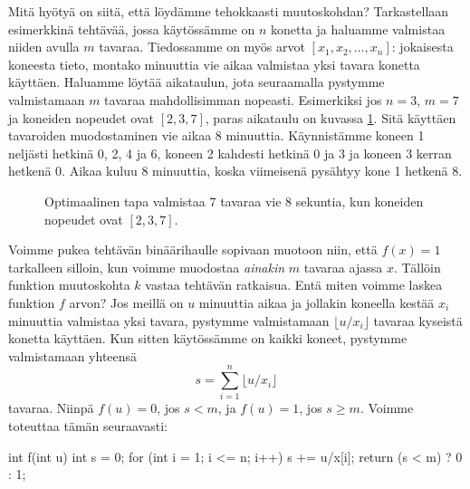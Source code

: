 Mitä hyötyä on siitä, että löydämme tehokkaasti muutoskohdan?
Tarkastellaan esimerkkinä tehtävää, jossa käytössämme on $n$ konetta
ja haluamme valmistaa niiden avulla $m$ tavaraa.
Tiedossamme on myös arvot $[x_1,x_2,\dots,x_n]$:
jokaisesta koneesta tieto, montako minuuttia vie aikaa valmistaa
yksi tavara konetta käyttäen.
Haluamme löytää aikataulun, jota seuraamalla pystymme valmistamaan
$m$ tavaraa mahdollisimman nopeasti.
Esimerkiksi jos $n=3$, $m=7$ ja koneiden nopeudet ovat $[2,3,7]$,
paras aikataulu on kuvassa \ref{fig:optkon}.
Sitä käyttäen tavaroiden muodostaminen vie aikaa $8$ minuuttia.
Käynnistämme koneen 1 neljästi hetkinä 0, 2, 4 ja 6,
koneen 2 kahdesti hetkinä 0 ja 3
ja koneen 3 kerran hetkenä 0.
Aikaa kuluu $8$ minuuttia, koska viimeisenä pysähtyy kone 1 hetkenä 8.

\begin{figure}
\center
{}
\caption{Optimaalinen tapa valmistaa 7 tavaraa vie 8 sekuntia,
kun koneiden nopeudet ovat $[2,3,7]$.}
\label{fig:optkon}
\end{figure}

Voimme pukea tehtävän binäärihaulle sopivaan muotoon niin,
että $f(x)=1$ tarkalleen silloin, kun voimme muodostaa
\emph{ainakin} $m$ tavaraa ajassa $x$.
Tällöin funktion muutoskohta $k$ vastaa tehtävän ratkaisua.
Entä miten voimme laskea funktion $f$ arvon?
Jos meillä on $u$ minuuttia aikaa ja jollakin koneella kestää $x_i$
minuuttia valmistaa yksi tavara, pystymme valmistamaan
$\lfloor u/x_i \rfloor$ tavaraa kyseistä konetta käyttäen.
Kun sitten käytössämme on kaikki koneet,
pystymme valmistamaan yhteensä
\[ s = \sum_{i=1}^n \lfloor u/x_i \rfloor \]
tavaraa. Niinpä $f(u)=0$, jos $s<m$,
ja $f(u)=1$, jos $s \ge m$. Voimme toteuttaa tämän seuraavasti:

\begin{code}
int f(int u) {
    int s = 0;
    for (int i = 1; i <= n; i++) s += u/x[i];
    return (s < m) ? 0 : 1;
}
\end{code}

